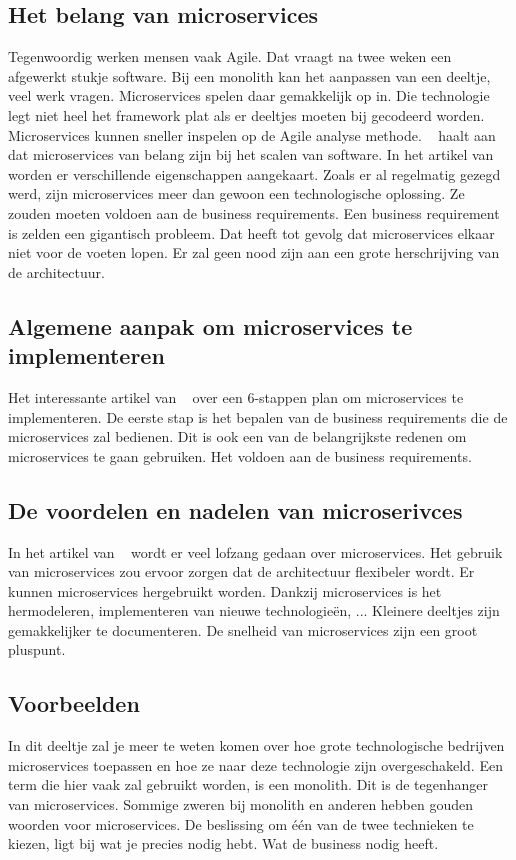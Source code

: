 \subsection{Het belang van microservices}
Tegenwoordig werken mensen vaak Agile. Dat vraagt na twee weken een afgewerkt stukje software. Bij een monolith kan het aanpassen van een deeltje, veel werk vragen. Microservices spelen daar gemakkelijk op in. Die technologie legt niet heel het framework plat als er deeltjes moeten bij gecodeerd worden. Microservices kunnen sneller inspelen op de Agile analyse methode.
~\cite{series2018} haalt aan dat microservices van belang zijn bij het scalen van software.
In het artikel van ~\cite{RDX2016} worden er verschillende eigenschappen aangekaart. Zoals er al regelmatig gezegd werd, zijn microservices meer dan gewoon een technologische oplossing. Ze zouden moeten voldoen aan de business requirements. Een business requirement is zelden een gigantisch probleem. Dat heeft tot gevolg dat microservices elkaar niet voor de voeten lopen. Er zal geen nood zijn aan een grote herschrijving van de architectuur.
\subsection{Algemene aanpak om microservices te implementeren}
Het interessante artikel van ~\cite{Benetis2016} over een 6-stappen plan om microservices te implementeren.
De eerste stap is het bepalen van de business requirements die de microservices zal bedienen. Dit is ook een van de belangrijkste redenen om microservices te gaan gebruiken. Het voldoen aan de business requirements. 
\subsection{De voordelen en nadelen van microserivces}
In het artikel van ~\cite{series2018} wordt er veel lofzang gedaan over microservices. Het gebruik van microservices zou ervoor zorgen dat de architectuur flexibeler wordt. Er kunnen microservices hergebruikt worden. Dankzij microservices is het hermodeleren, implementeren van nieuwe technologieën, ... 
Kleinere deeltjes zijn gemakkelijker te documenteren. De snelheid van microservices zijn een groot pluspunt.
\subsection{Voorbeelden}
In dit deeltje zal je meer te weten komen over hoe grote technologische bedrijven microservices toepassen en hoe ze naar deze technologie zijn overgeschakeld.
Een term die hier vaak zal gebruikt worden, is een monolith. Dit is de tegenhanger van microservices. Sommige zweren bij monolith en anderen hebben gouden woorden voor microservices. De beslissing om één van de twee technieken te kiezen, ligt bij wat je precies nodig hebt. Wat de business nodig heeft. 
